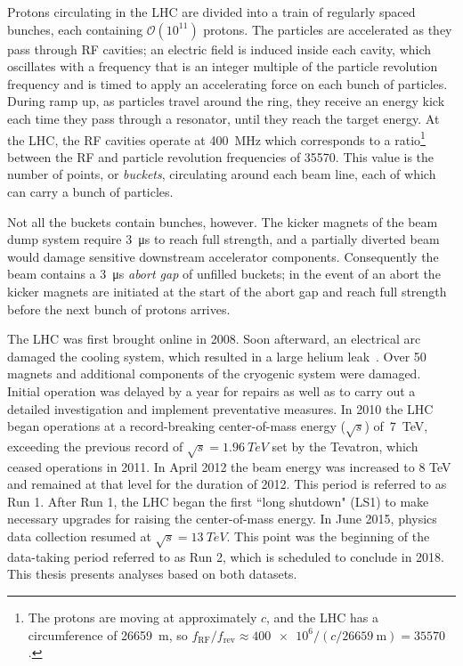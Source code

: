 Protons circulating in the LHC are divided into a train of regularly spaced
bunches, each containing $\mathcal{O}(10^{11})$ protons. The particles are
accelerated as they pass through RF cavities; an electric field is induced
inside each cavity, which oscillates with a frequency that is an integer
multiple of the particle revolution frequency and is timed to apply an
accelerating force on each bunch of particles. During ramp up, as particles
travel around the ring, they receive an energy kick each time they pass through
a resonator, until they reach the target energy. At the LHC, the RF cavities
operate at \SI{400}{\mega\hertz} which corresponds to a ratio\footnote{The
protons are moving at approximately $c$, and the LHC has a circumference of
\SI{26659}{\meter}, so $f_\text{RF}/f_\text{rev} \approx \num{400e6} / (c /
\SI{26659}{\meter})=\num{35570}$.} between the RF and particle revolution
frequencies of \num{35570}. This value is the number of points, or
\textit{buckets}, circulating around each beam line, each of which can carry a
bunch of particles.

Not all the buckets contain bunches, however. The kicker magnets of the beam
dump system require \SI{3}{\micro\second} to reach full strength, and a
partially diverted beam would damage sensitive downstream accelerator
components. Consequently the beam contains a \SI{3}{\micro\second} \textit{abort
gap} of unfilled buckets; in the event of an abort the kicker magnets are
initiated at the start of the abort gap and reach full strength before the next
bunch of protons arrives.

The LHC was first brought online in 2008. Soon afterward, an electrical arc
damaged the cooling system, which resulted in a large helium
leak~\cite{2008LHCincident}. Over \num{50} magnets and additional components of
the cryogenic system were damaged. Initial operation was delayed by a year for
repairs as well as to carry out a detailed investigation and implement
preventative measures. In 2010 the LHC began operations at a record-breaking
center-of-mass energy ($\sqrt{s}$) of~\SI{7}{TeV}, exceeding the previous record
of $\sqrt{s}=\SI{1.96}{TeV}$ set by the Tevatron, which ceased operations in
2011. In April 2012 the beam energy was increased to 8 TeV and remained at that
level for the duration of 2012. This period is referred to as Run 1. After Run
1, the LHC began the first ``long shutdown" (LS1) to make necessary upgrades for
raising the center-of-mass energy. In June 2015, physics data collection resumed
at $\sqrt{s}=\SI{13}{TeV}$. This point was the beginning of the data-taking
period referred to as Run 2, which is scheduled to conclude in 2018. This thesis
presents analyses based on both datasets.

